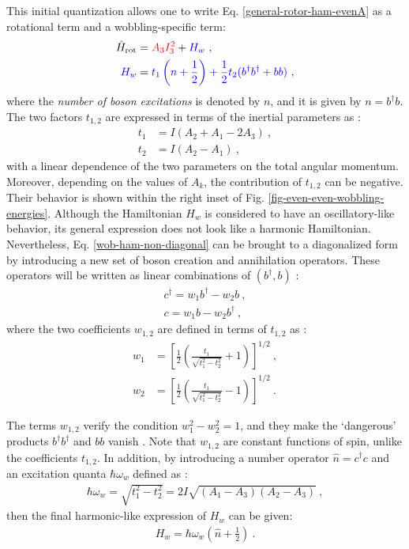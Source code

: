 This initial quantization allows one to write Eq. \ref{general-rotor-ham-evenA} as a rotational term and a wobbling-specific term:
\begin{align}
    \hat{H}_\text{rot}&={\color{red}A_3I_3^2}+{\color{blue}H_w}\ ,\label{rot-ham-non-diagonal} \\
    {\color{blue}H_w}&={\color{blue}t_1\left(n+\frac{1}{2}\right)+\frac{1}{2}t_2(b^\dagger b^\dagger + bb)}\ ,
    \label{wob-ham-non-diagonal}
\end{align}
where the \emph{number of boson excitations} is denoted by $n$, and it is given by $n=b^\dagger b$. The two factors $t_{1,2}$ are expressed in terms of the inertial parameters as \cite{bohr1998nuclear}:
\begin{align}
    t_1&=I(A_2+A_1-2A_3)\ , \\
    t_2&=I(A_2-A_1)\ ,
    \label{t1-t2-terms}
\end{align}
with a linear dependence of the two parameters on the total angular momentum. Moreover, depending on the values of $A_k$, the contribution of $t_{1,2}$ can be negative. Their behavior is shown within the right inset of Fig. \ref{fig-even-even-wobbling-energies}. Although the Hamiltonian $H_w$ is considered to have an oscillatory-like behavior, its general expression does not look like a harmonic Hamiltonian. Nevertheless, Eq. \ref{wob-ham-non-diagonal} can be brought to a diagonalized form by introducing a new set of boson creation and annihilation operators. These operators will be written as linear combinations of $(b^\dagger,b)$ \cite{bohr1998nuclear}:
\begin{align}
    c^\dagger=w_1b^\dagger-w_2b\ ,\\
    c=w_1b-w_2b^\dagger\ ,
\end{align}
where the two coefficients $w_{1,2}$ are defined in terms of $t_{1,2}$ as \cite{bohr1998nuclear}:
\begin{align}
    w_1&=\left[\frac{1}{2}\left(\frac{t_1}{\sqrt{t_1^2-t_2^2}}+1\right)\right]^{1/2}\ ,\nonumber\\
    w_2&=\left[\frac{1}{2}\left(\frac{t_1}{\sqrt{t_1^2-t_2^2}}-1\right)\right]^{1/2}\ .
    \label{eqs-w1-w2-terms-wobbling}
\end{align}

The terms $w_{1,2}$ verify the condition $w_1^2-w_2^2=1$, and they make the `dangerous' products $b^\dagger b^\dagger$ and $bb$ vanish \cite{oi2006semi}. Note that $w_{1,2}$ are constant functions of spin, unlike the coefficients $t_{1,2}$. In addition, by introducing a number operator $\hat{n}=c^\dagger c$ and an excitation quanta $\hbar\omega_w$ defined as \cite{bohr1998nuclear}:
\begin{align}
    \hbar\omega_w=\sqrt{t_1^2-t_2^2}=2I\sqrt{(A_1-A_3)(A_2-A_3)}\ ,
    \label{wobbling-frequency-even-A}
\end{align}
then the final harmonic-like expression of $H_w$ can be given:
\begin{align}
    H_w=\hbar\omega_w\left(\hat{n}+\frac{1}{2}\right)\ .
    \label{wob-ham-diagonal}
\end{align}

